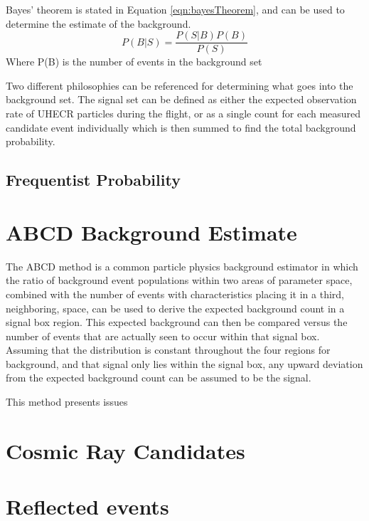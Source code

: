 	Bayes' theorem is stated in Equation \ref{eqn:bayesTheorem}, and can be used to determine the estimate of the background.
	\begin{equation}
		P(B | S) = \frac{P(S | B) P(B)}{P(S)}
		\label{eqn:bayesTheorem}
	\end{equation}
	Where P(B) is the number of events in the background set
	
	
	Two different philosophies can be referenced for determining what goes into the background set.  The signal set can be defined as either the expected observation rate of UHECR particles during the flight, or as a single count for each measured candidate event individually which is then summed to find the total background probability.
	
	\subsection{Frequentist Probability}
		
	
\section{ABCD Background Estimate}
		The ABCD method is a common particle physics background estimator in which the ratio of background event populations within two areas of parameter space, combined with the number of events with characteristics placing it in a third, neighboring, space, can be used to derive the expected background count in a signal box region.  This expected background can then be compared versus the number of events that are actually seen to occur within that signal box.  Assuming that the distribution is constant throughout the four regions for background, and that signal only lies within the signal box, any upward deviation from the expected background count can be assumed to be the signal.
		
		This method presents issues 
		
		



\section{Cosmic Ray Candidates}

	\section{Reflected events}
	
